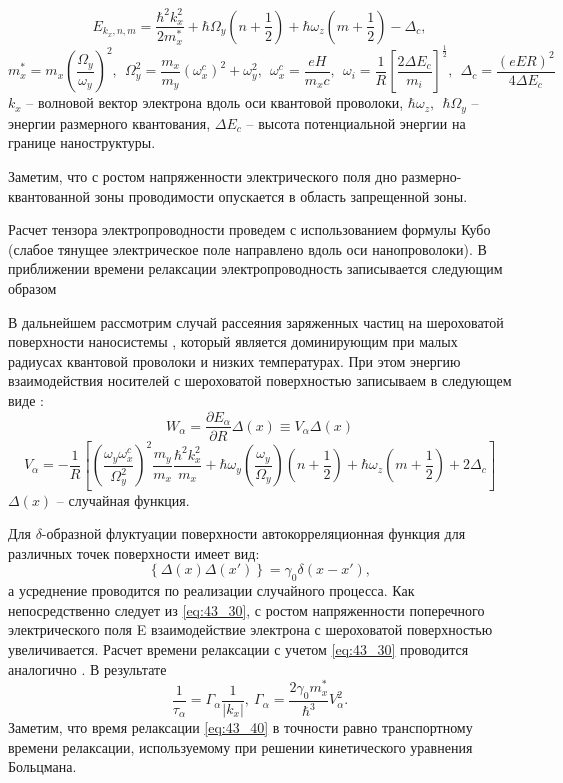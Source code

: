 \begin{equation} \label{eq:43_10}
	E_{k_x,n,m}=\frac{{\hbar }^2k^2_x}{2m^*_x}+\hbar {\Omega }_y\left(n+\frac{1}{2}\right)+\hbar {\omega }_z\left(m+\frac{1}{2}\right)-{\Delta }_c,   
\end{equation}
\[
m^*_x=m_x{\left(\frac{{\Omega }_y}{{\omega }_y}\right)}^2,\ \ {\Omega }^2_y=\frac{m_x}{m_y}{\left({\omega }^c_x\right)}^2+{\omega }^2_y,\ \ {\omega }^c_x=\frac{eH}{m_xc},\ \ {\omega }_i=\frac{1}{R}{\left[\frac{2\Delta E_c}{m_i}\right]}^{\frac{1}{2}},\ \ {\Delta }_c=\frac{{\left(eER\right)}^2}{4\Delta E_c}
\]
$k_x$ -- волновой вектор электрона вдоль оси квантовой проволоки, $\hbar {\omega }_z,\ \ \hbar {\Omega }_y$ -- энергии размерного квантования, $\Delta E_c$ -- высота потенциальной энергии на границе наноструктуры.

Заметим, что с ростом напряженности электрического поля дно размерно-квантованной зоны проводимости опускается в область запрещенной зоны.

Расчет тензора электропроводности проведем с использованием формулы Кубо
\cite{Kubo1957a} (слабое тянущее электрическое поле направлено вдоль оси нанопроволоки). В приближении времени релаксации \cite{Khamidullin2002} электропроводность записывается следующим образом 

В дальнейшем рассмотрим случай рассеяния заряженных частиц на шероховатой поверхности наносистемы \cite{Sakaki1987},  который является доминирующим при малых радиусах квантовой проволоки и низких температурах. При этом энергию взаимодействия носителей с шероховатой поверхностью записываем в следующем виде \cite{Sakaki1987,Motohisa1992}:
\begin{equation} \label{eq:43_30} 
W_{\alpha }=\frac{\partial E_{\alpha }}{\partial R}\Delta \left(x\right)\equiv V_{\alpha }\Delta \left(x\right) 
\end{equation}
\[
V_{\alpha }=-\frac{1}{R}\left[{\left(\frac{{\omega }_y{\omega }^c_x}{{\Omega }^2_y}\right)}^2\frac{m_y}{m_x}\frac{{\hbar }^2k^2_x}{m_x}+\hbar {\omega }_y\left(\frac{{\omega }_y}{{\Omega }_y}\right)\left(n+\frac{1}{2}\right)+\hbar {\omega }_z\left(m+\frac{1}{2}\right)+2{\Delta }_c\right]
\] 
$\Delta \left(x\right)$ -- случайная функция.

Для $\delta $-образной флуктуации поверхности автокорреляционная функция для различных точек поверхности имеет вид:
\[
\left\{\Delta \left(x\right)\Delta \left(x'\right)\right\}={\gamma }_0\delta \left(x-x'\right),
\] 
а усреднение проводится по реализации случайного процесса.  Как непосредственно следует из \eqref{eq:43_30}, с ростом напряженности поперечного электрического поля E взаимодействие электрона с шероховатой поверхностью увеличивается. Расчет времени релаксации с учетом \eqref{eq:43_30} проводится аналогично \cite{Karapetyan2011}. В результате
\begin{equation} \label{eq:43_40} 
\frac{1}{{\tau }_{\alpha }}={\Gamma }_{\alpha }\frac{1}{\left|k_x\right|},\ {\Gamma }_{\alpha }=\frac{2{\gamma }_0m^*_x}{{\hbar }^3}V^2_{\alpha }.  
\end{equation}
Заметим, что время релаксации \eqref{eq:43_40} в точности равно транспортному времени релаксации, используемому при решении кинетического уравнения Больцмана.

